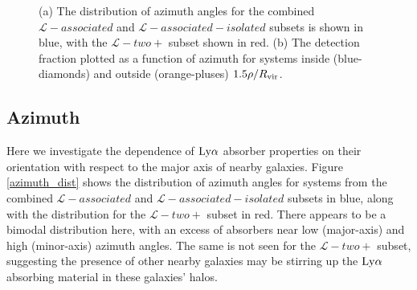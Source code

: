\documentclass[twocolumn,tighten]{aastex62}
\begin{document}
\begin{figure}[ht!]
        \centering
        \vspace{0pt}
        
        \caption{\small{(a) The distribution of azimuth angles for the combined $\mathcal{L}-associated$ and $\mathcal{L}-associated-isolated$ subsets is shown in blue, with the $\mathcal{L}-two+$ subset shown in red. (b) The detection fraction plotted as a function of azimuth for systems inside (blue-diamonds) and outside (orange-pluses) $1.5 \rho / R_{\rm vir}$.}}
        \vspace{5pt}
        \label{detection_fraction_inc_both}
\end{figure}


\subsection{Azimuth}
Here we investigate the dependence of $\rm Ly\alpha$ absorber properties on their orientation with respect to the major axis of nearby galaxies. Figure \ref{azimuth_dist} shows the distribution of azimuth angles for systems from the combined $\mathcal{L}-associated$ and $\mathcal{L}-associated-isolated$ subsets in blue, along with the distribution for the $\mathcal{L}-two+$ subset in red. There appears to be a bimodal distribution here, with an excess of absorbers near low (major-axis) and high (minor-axis) azimuth angles. The same is not seen for the 
$\mathcal{L}-two+$ subset, suggesting the presence of other nearby galaxies may be stirring up the $\rm Ly\alpha$ absorbing material in these galaxies' halos. 
\end{document}
